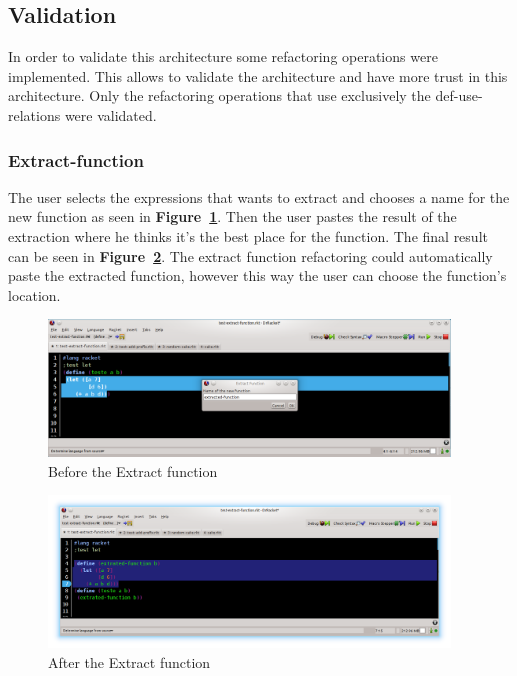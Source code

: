 \subsection{Validation}
In order to validate this architecture some refactoring operations were implemented. 
This allows to validate the architecture and have more trust in this architecture.
Only the refactoring operations that use exclusively the def-use-relations were validated.

\subsubsection{Extract-function}
The user selects the expressions that wants to extract and chooses a name for the new function as seen in {\bf Figure~\ref{fig:extractBefore}}.
Then the user pastes the result of the extraction where he thinks it's the best place for the function. 
The final result can be seen in {\bf Figure~\ref{fig:extractAfter}}.
The extract function refactoring could automatically paste the extracted function, however this way the user can choose the function's location.
\begin{figure}[htbp]
	\centering
	\includegraphics[width=0.95\textwidth]{img/extract1.png}
	\caption{Before the Extract function}
	\label{fig:extractBefore}
\end{figure}

\begin{figure}[htbp]
	\centering
	\includegraphics[width=0.95\textwidth]{img/extract2.png}
	\caption{After the Extract function}
	\label{fig:extractAfter}
\end{figure}

